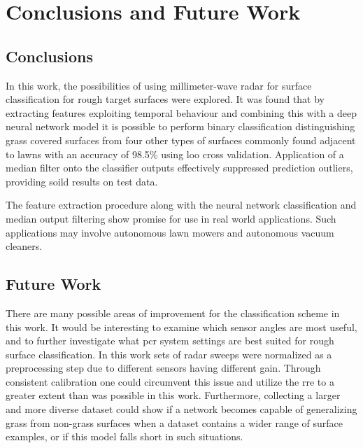 \chapter{Conclusions and Future Work}

\section{Conclusions}

In this work, the possibilities of using millimeter-wave radar for surface classification for rough target surfaces were explored. It was found that by extracting features exploiting temporal behaviour and combining this with a deep neural network model it is possible to perform binary classification distinguishing grass covered surfaces from four other types of surfaces commonly found adjacent to lawns with an accuracy of 98.5\% using \gls{loo} cross validation. Application of a median filter onto the classifier outputs effectively suppressed prediction outliers, providing soild results on test data. 

The feature extraction procedure along with the neural network classification and median output filtering show promise for use in real world applications. Such applications may involve autonomous lawn mowers and autonomous vacuum cleaners. 



\section{Future Work}

There are many possible areas of improvement for the classification scheme in this work. It would be interesting to examine which sensor angles are most useful, and to further investigate what \gls{pcr} system settings are best suited for rough surface classification. In this work sets of radar sweeps were normalized as a preprocessing step due to different sensors having different gain. Through consistent calibration one could circumvent this issue and utilize the \gls{rre} to a greater extent than was possible in this work. Furthermore, collecting a larger and more diverse dataset could show if a network becomes capable of generalizing grass from non-grass surfaces when a dataset contains a wider range of surface examples, or if this model falls short in such situations. 

